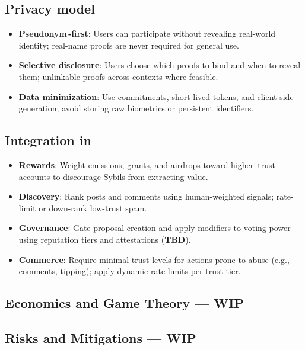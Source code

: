 \documentclass[10pt]{article}
\begin{document}
    \subsection{Privacy model}
      \begin{itemize}[leftmargin=*]
        \item \textbf{Pseudonym\,-first}: Users can participate without revealing real-world identity; real-name proofs are never required for general use.
        \item \textbf{Selective disclosure}: Users choose which proofs to bind and when to reveal them; unlinkable proofs across contexts where feasible.
        \item \textbf{Data minimization}: Use commitments, short-lived tokens, and client-side generation; avoid storing raw biometrics or persistent identifiers.
      \end{itemize}

    \subsection{Integration in \projectname{}}
      \begin{itemize}[leftmargin=*]
        \item \textbf{Rewards}: Weight \textbf{\tokenticker{}} emissions, grants, and airdrops toward higher\,-trust accounts to discourage Sybils from extracting value.
        \item \textbf{Discovery}: Rank posts and comments using human-weighted signals; rate-limit or down-rank low-trust spam.
        \item \textbf{Governance}: Gate proposal creation and apply modifiers to voting power using reputation tiers and attestations (\textbf{TBD}).
        \item \textbf{Commerce}: Require minimal trust levels for actions prone to abuse (e.g., comments, tipping); apply dynamic rate limits per trust tier.
      \end{itemize}

    \subsection{Economics and Game Theory --- WIP}

    \subsection{Risks and Mitigations --- WIP}
\end{document}
